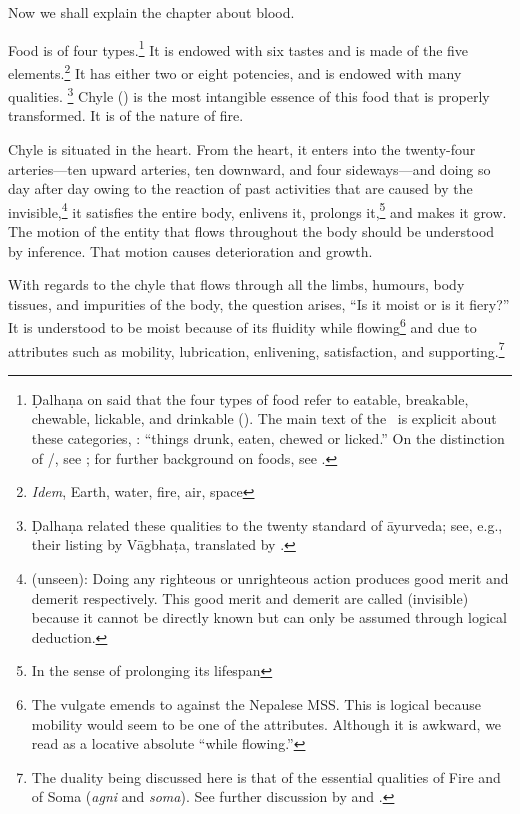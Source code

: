 \begin{translation}    
\item [1] Now we shall explain the chapter about blood.


    
\item [3] Food is of four types.\footnote{Ḍalhaṇa on  said
    that the four types of food refer to eatable, breakable, chewable,
    lickable, and drinkable (). The main text of
    the \CS\ is explicit about these categories, :
     “things drunk, eaten, chewed or licked.” On
    the distinction of /, see \cite{yagi-1994}; for
    further background on foods, see \cite{oliv-2001}.} It is endowed with
    six tastes and is made of the five elements.\footnote{\emph{Idem}, Earth,
        water, fire, air, space} It has either two or eight potencies, and is
        endowed with many qualities. \footnote{Ḍalhaṇa related these qualities to
            the twenty standard  of āyurveda; see, e.g., their listing by
            Vāgbhaṭa, translated by \citet[207]{wuja-2003}.} Chyle () is
            the most intangible essence of this food that is properly transformed. It
            is of the nature of fire.
                
Chyle is situated in the heart. From the heart, it enters into the
twenty-four arteries—ten upward arteries, ten downward, and four
sideways—and doing so day after day owing to the reaction of past
activities that are caused by the invisible,\footnote{
    (unseen): Doing any righteous or unrighteous action produces good merit
    and demerit respectively. This good merit and demerit are called
     (invisible) because it cannot be directly known but can only
    be assumed through logical deduction.} it satisfies the entire body,
    enlivens it, prolongs it,\footnote{In the sense of prolonging its
        lifespan} and makes it grow. The motion of the entity that flows
        throughout the body should be understood by inference. That motion causes
        deterioration and growth.
    
With regards to the chyle that flows through all the limbs, humours, body tissues, 
and impurities of the body, the question arises, “Is it moist or is it fiery?” It is 
understood to be moist because of its fluidity while flowing\footnote{The vulgate 
emends  to  against the Nepalese MSS. This is 
logical because mobility would seem to be one of the attributes.  Although it is 
awkward, we read  as a locative absolute ``while flowing.''} and 
due to attributes such as mobility, lubrication, enlivening, satisfaction, and 
supporting.\footnote{The duality being discussed here is that of the essential 
qualities of Fire and of Soma (\emph{agni} and \emph{soma}). See further 
discussion by \citet{wuja-2004} and \citet{ange-2021}.}
    

\end{translation}
